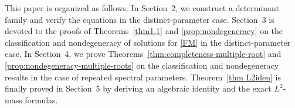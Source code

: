 \documentclass[11pt]{article}
\numberwithin{equation}{section}
\theoremstyle{definition}
\newtheorem{remark}{Remark}[section]
\begin{document}




%	
%
%	




This paper is organized as follows. In Section~2, we construct a determinant family and verify the equations in the distinct-parameter case. Section~3 is devoted to the proofs of Theorems~\ref{thm1.1} and \ref{prop:nondegeneracy} on the classification and nondegeneracy of solutions for \eqref{FM} in the distinct-parameter case. In Section~4, we prove Theorems~\ref{thm:completeness-multiple-root} and \ref{prop:nondegeneracy-multiple-roots} on the classification and nondegeneracy results in the case of repeated spectral parameters.  Theorem~\ref{thm L2iden} is finally proved in Section~5 by deriving an algebraic identity and the exact $L^2$-mass formulas.
\end{document}
